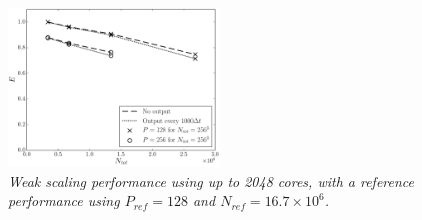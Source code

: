 \documentclass[10pt]{article}
\begin{document}
\begin{figure}[t]
\centering
\includegraphics[width=0.5\textwidth]{Figures/weak_scaling.pdf}
\caption{\small \textit{Weak scaling performance using up to 2048 cores, with a reference performance using $P_\mathit{ref} = 128$ and $N_\mathit{ref} = 16.7\times10^6$.}}
\label{fig:weak_scaling}
\end{figure}
\end{document}
